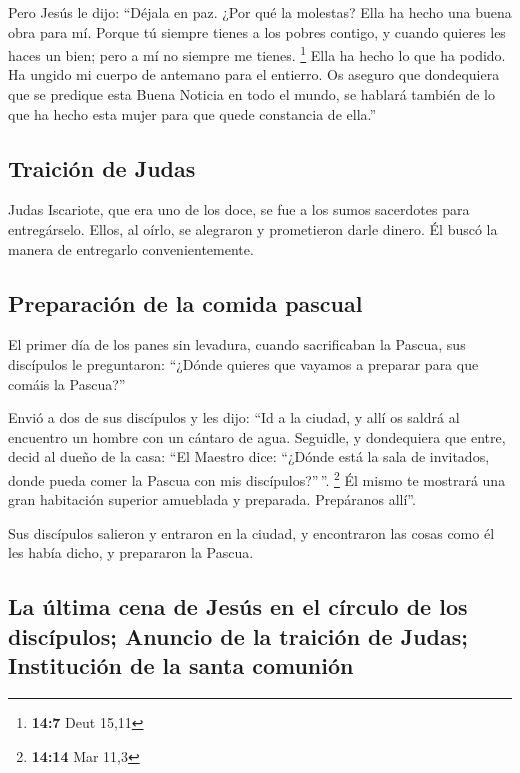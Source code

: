 \begin{paracol}{2}
 Pero Jesús le dijo: ``Déjala en paz. ¿Por qué la
molestas? Ella ha hecho una buena obra para mí.  Porque tú
siempre tienes a los pobres contigo, y cuando quieres les haces un bien;
pero a mí no siempre me tienes. \footnote{\textbf{14:7} Deut 15,11}
 Ella ha hecho lo que ha podido. Ha ungido mi cuerpo de
antemano para el entierro.  Os aseguro que dondequiera que
se predique esta Buena Noticia en todo el mundo, se hablará también de
lo que ha hecho esta mujer para que quede constancia de ella.''

\hypertarget{traiciuxf3n-de-judas}{%
\subsection{Traición de Judas}\label{traiciuxf3n-de-judas}}

 Judas Iscariote, que era uno de los doce, se fue a los
sumos sacerdotes para entregárselo.  Ellos, al oírlo, se
alegraron y prometieron darle dinero. Él buscó la manera de entregarlo
convenientemente.

\hypertarget{preparaciuxf3n-de-la-comida-pascual}{%
\subsection{Preparación de la comida
pascual}\label{preparaciuxf3n-de-la-comida-pascual}}

 El primer día de los panes sin levadura, cuando
sacrificaban la Pascua, sus discípulos le preguntaron: ``¿Dónde quieres
que vayamos a preparar para que comáis la Pascua?''

 Envió a dos de sus discípulos y les dijo: ``Id a la
ciudad, y allí os saldrá al encuentro un hombre con un cántaro de agua.
Seguidle,  y dondequiera que entre, decid al dueño de la
casa: ``El Maestro dice: ``¿Dónde está la sala de invitados, donde pueda
comer la Pascua con mis discípulos?''\,''. \footnote{\textbf{14:14} Mar
  11,3}  Él mismo te mostrará una gran habitación
superior amueblada y preparada. Prepáranos allí''.

 Sus discípulos salieron y entraron en la ciudad, y
encontraron las cosas como él les había dicho, y prepararon la Pascua.

\hypertarget{la-uxfaltima-cena-de-jesuxfas-en-el-cuxedrculo-de-los-discuxedpulos-anuncio-de-la-traiciuxf3n-de-judas-instituciuxf3n-de-la-santa-comuniuxf3n}{%
\subsection{La última cena de Jesús en el círculo de los discípulos;
Anuncio de la traición de Judas; Institución de la santa
comunión}\label{la-uxfaltima-cena-de-jesuxfas-en-el-cuxedrculo-de-los-discuxedpulos-anuncio-de-la-traiciuxf3n-de-judas-instituciuxf3n-de-la-santa-comuniuxf3n}}


\end{paracol}
